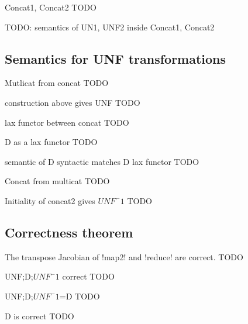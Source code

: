 \begin{example}{Concat1, Concat2}
    TODO
\end{example}

TODO: semantics of UN1, UNF2 inside Concat1, Concat2

\subsection{Semantics for UNF transformations} %
\label{sub:Semantics for UNF transformations}

\begin{definition}{Mutlicat from concat}
    TODO
\end{definition}

\begin{proposition}{construction above gives UNF}
    TODO
\end{proposition}

\begin{definition}{lax functor between concat}
    TODO
\end{definition}

\begin{example}{D as a lax functor}
    TODO
\end{example}

\begin{proposition}{semantic of D syntactic matches D lax functor}
    TODO
\end{proposition}

\begin{definition}{Concat from multicat}
    TODO
\end{definition}

\begin{proposition}{Initiality of concat2 gives $UNF^-1$}
    TODO
\end{proposition}

\subsection{Correctness theorem} %
\label{sub:Correctness theorem}

\begin{proposition}{The transpose Jacobian of !map2! and !reduce! are correct.}
    TODO
\end{proposition}

\begin{theorem}{UNF;D;$UNF^-1$ correct}
    TODO
\end{theorem}

\begin{proposition}{UNF;D;$UNF^-1$=D}
    TODO
\end{proposition}

\begin{theorem}{D is correct}
    TODO
\end{theorem}